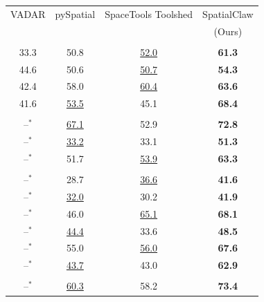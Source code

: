 \documentclass{llmxive}
\providecommand{\ours}{SpatialClaw}
\begin{document}
\begin{table}[t]
{  \begin{tabular}[t]{cccc}
  \toprule
  \rowcolor{white}VADAR                       & pySpatial                & SpaceTools Toolshed                          & \ours{} \\
  \rowcolor{white}\citep{marsili2025visual}   & \citep{luo2026pyspatial} & \citep{chen2025spacetools} & (Ours)  \\
  \midrule
  \multicolumn{4}{c}{\strut} \\
  33.3 & 50.8 & \cellcolor{secondcell}\underline{52.0} & \cellcolor{bestcell}\textbf{61.3} \\
  44.6 & 50.6 & \cellcolor{secondcell}\underline{50.7} & \cellcolor{bestcell}\textbf{54.3} \\
  42.4 & 58.0 & \cellcolor{secondcell}\underline{60.4} & \cellcolor{bestcell}\textbf{63.6} \\
  41.6 & \cellcolor{secondcell}\underline{53.5} & 45.1 & \cellcolor{bestcell}\textbf{68.4} \\
  \midrule
  \multicolumn{4}{c}{\strut} \\
  --$^{*}$ & \cellcolor{secondcell}\underline{67.1} & 52.9 & \cellcolor{bestcell}\textbf{72.8} \\
  --$^{*}$ & \cellcolor{secondcell}\underline{33.2} & 33.1 & \cellcolor{bestcell}\textbf{51.3} \\
  --$^{*}$ & 51.7 & \cellcolor{secondcell}\underline{53.9} & \cellcolor{bestcell}\textbf{63.3} \\
  \midrule
  \multicolumn{4}{c}{\strut} \\
  --$^{*}$ & 28.7 & \cellcolor{secondcell}\underline{36.6} & \cellcolor{bestcell}\textbf{41.6} \\
  --$^{*}$ & \cellcolor{secondcell}\underline{32.0} & 30.2 & \cellcolor{bestcell}\textbf{41.9} \\
  --$^{*}$ & 46.0 & \cellcolor{secondcell}\underline{65.1} & \cellcolor{bestcell}\textbf{68.1} \\
  --$^{*}$ & \cellcolor{secondcell}\underline{44.4} & 33.6 & \cellcolor{bestcell}\textbf{48.5} \\
  --$^{*}$ & 55.0 & \cellcolor{secondcell}\underline{56.0} & \cellcolor{bestcell}\textbf{67.6} \\
  --$^{*}$ & \cellcolor{secondcell}\underline{43.7} & 43.0 & \cellcolor{bestcell}\textbf{62.9} \\
  \midrule
  \multicolumn{4}{c}{\strut} \\
  --$^{*}$ & \cellcolor{secondcell}\underline{60.3} & 58.2 & \cellcolor{bestcell}\textbf{73.4} \\

\end{tabular}}
\end{table}
\end{document}
